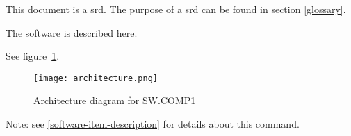 \documentclass[a4paper]{report}
\begin{document}
    

    \tableofcontents
    \pagebreak

    \listoffigures
    \pagebreak

    \listoftables
    \pagebreak

    \blindtext[1]


    This document is a \acrfull{srd}. The purpose of a \acrshort{srd} can be found in section \ref{glossary}.

    \label{glossary}
    \printglossary[style=clong]
    \printglossary[type=\acronymtype]

    \blindtext[1]

    \blindtext[10]

    \blindtext[1]

    \blindtext[1]

    \label{software-item-description}

    The \gls{software} is described here.

    \blindtext[1]

    \blindtext[1]


    See figure~\ref{fig:architecture-diagram}.

    \begin{figure}[H]
    \texttt{[image: architecture.png]}
    \caption{Architecture diagram for SW.COMP1}
    \centering\label{fig:architecture-diagram}
    \end{figure}

    \blindtext[1]




    \blindtext[10]


    \blindtext[1]

    

    Note: see \ref{software-item-description} for details about this command.
\end{document}
